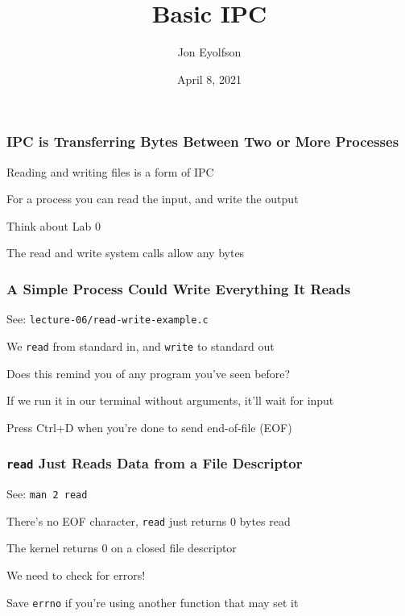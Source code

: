 

\title{Basic IPC}
\author{Jon Eyolfson}
\date{April 8, 2021}


  \begin{frame}
    \titlepage
  \end{frame}

  \begin{frame}
    \frametitle{IPC is Transferring Bytes Between Two or More Processes}

    Reading and writing files is a form of IPC

    \vspace{2em}

    For a process you can read the input, and write the output

    \hspace{2em} Think about Lab 0

    \vspace{2em}

    The read and write system calls allow any bytes
  \end{frame}

  \begin{frame}
    \frametitle{A Simple Process Could Write Everything It Reads}

    See: \texttt{lecture-06/read-write-example.c}

    \vspace{2em}

    We \texttt{read} from standard in, and \texttt{write} to standard out

    \hspace{2em} Does this remind you of any program you've seen before?

    \vspace{2em}

    If we run it in our terminal without arguments, it'll wait for input

    \hspace{2em} Press Ctrl+D when you're done to send end-of-file (EOF)
  \end{frame}

  \begin{frame}
    \frametitle{\texttt{read} Just Reads Data from a File Descriptor}

    See: \texttt{man 2 read}

    \vspace{2em}

    There's no EOF character, \texttt{read} just returns 0 bytes read

    \hspace{2em} The kernel returns 0 on a closed file descriptor

    \vspace{2em}

    We need to check for errors!

    \hspace{2em} Save \texttt{errno} if you're using another function that may
                 set it
  \end{frame}

